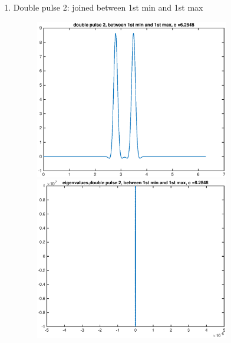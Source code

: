 \documentclass[12pt]{article}
\begin{document}
\begin{enumerate}
	\item Double pulse 2: joined between 1st min and 1st max
	\begin{figure}[H]
	\includegraphics[width=8.5cm]{2double2.eps}
	\includegraphics[width=8.5cm]{2double2eig.eps}
	\end{figure}


\end{enumerate}
\end{document}

